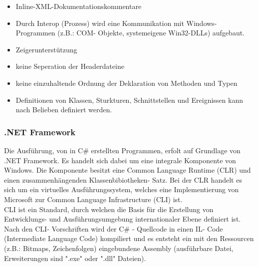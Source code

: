 \documentclass[12pt,a4paper]{report}
\begin{document}
\begin{onehalfspace}
\begin{itemize}
\item Inline-XML-Dokumentationskommentare
\item Durch Interop (Prozess) wird eine Kommunikation mit Windows- Programmen (z.B.: COM- Objekte, systemeigene Win32-DLLs) aufgebaut.
\item Zeigerunterstützung
\item keine Seperation der Headerdateine
\item keine einzuhaltende Ordnung der Deklaration von Methoden und Typen
\item Definitionen von Klassen, Sturkturen, Schnittstellen und Ereignissen kann nach Belieben definiert werden.
\end{itemize}

\subsubsection{.NET Framework}
Die Ausführung, von in C\# erstellten Programmen, erfolt auf Grundlage von .NET Framework. Es handelt sich dabei um eine integrale Komponente von Windows. Die Komponente besitzt eine Common Language Runtime (CLR) und einen zusammenhängenden Klassenbibiotheken- Satz. Bei der CLR handelt es sich um ein virtuelles Ausführungssystem, welches eine Implementierung von Microsoft zur Common Language Infrastructure (CLI) ist.\\

CLI ist ein Standard, durch welchen die Basis für die Erstellung von Entwicklungs- und Ausführungsumgebung internationaler Ebene definiert ist. Nach den CLI- Vorschriften wird der C\# - Quellcode in einen IL- Code (Intermediate Language Code) kompiliert und es entsteht ein mit den Ressourcen (z.B.: Bitmaps, Zeichenfolgen) eingebundene Assembly (ausführbare Datei, Erweiterungen sind "{}.exe"{} oder "{}.dll"{} Dateien).\\


\end{onehalfspace}
\end{document}
